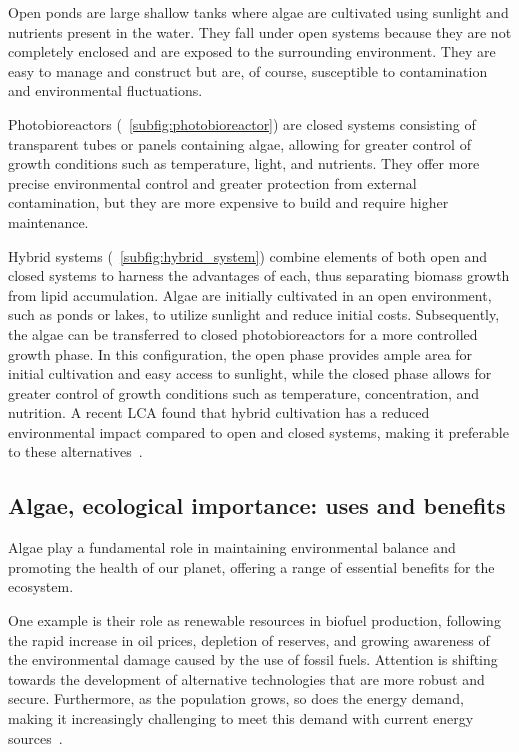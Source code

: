 Open ponds are large shallow tanks where algae are cultivated using sunlight and nutrients present in the water. They fall under open systems because they are not completely enclosed and are exposed to the surrounding environment. They are easy to manage and construct but are, of course, susceptible to contamination and environmental fluctuations.

Photobioreactors (\fig{}~\ref{subfig:photobioreactor}) are closed systems consisting of transparent tubes or panels containing algae, allowing for greater control of growth conditions such as temperature, light, and nutrients. They offer more precise environmental control and greater protection from external contamination, but they are more expensive to build and require higher maintenance.

Hybrid systems (\fig{}~\ref{subfig:hybrid_system}) combine elements of both open and closed systems to harness the advantages of each, thus separating biomass growth from lipid accumulation. Algae are initially cultivated in an open environment, such as ponds or lakes, to utilize sunlight and reduce initial costs. Subsequently, the algae can be transferred to closed photobioreactors for a more controlled growth phase. In this configuration, the open phase provides ample area for initial cultivation and easy access to sunlight, while the closed phase allows for greater control of growth conditions such as temperature,  concentration, and nutrition. A recent LCA found that hybrid cultivation has a reduced environmental impact compared to open and closed systems, making it preferable to these alternatives~\parencite{narala_Comparison_2016}.


\subsection{Algae, ecological importance: uses and benefits}
Algae play a fundamental role in maintaining environmental balance and promoting the health of our planet, offering a range of essential benefits for the ecosystem.

One example is their role as renewable resources in biofuel production, following the rapid increase in oil prices, depletion of reserves, and growing awareness of the environmental damage caused by the use of fossil fuels. Attention is shifting towards the development of alternative technologies that are more robust and secure. Furthermore, as the population grows, so does the energy demand, making it increasingly challenging to meet this demand with current energy sources~\parencite{faruk_role_2023}.

